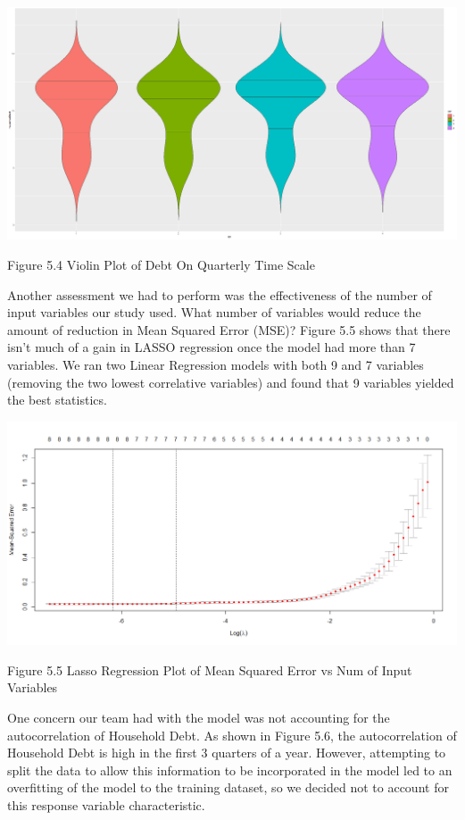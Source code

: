 \documentclass[sigconf,nonacm,11pt]{acmart}
\begin{document}
 
\vspace{0.5em}
\includegraphics[scale = 0.13]{QtrVSHouseholdDebt_violinPlot.png}

Figure 5.4 Violin Plot of Debt On Quarterly Time Scale
\vspace{0.75em}

Another assessment we had to perform was the effectiveness of the number of input variables our study used. What number of variables would reduce the amount of reduction in Mean Squared Error (MSE)?  Figure 5.5 shows that there isn't much of a gain in LASSO regression once the model had more than 7 variables.  We ran two Linear Regression models with both 9 and 7 variables (removing the two lowest correlative variables) and found that 9 variables yielded the best statistics.


\vspace{0.5em}
\includegraphics[scale = 0.18]{LASSORegression_Plot.png}

Figure 5.5 Lasso Regression Plot of Mean Squared Error vs Num of Input Variables
\vspace{0.75em}

One concern our team had with the model was not accounting for the autocorrelation of Household Debt.  As shown in Figure 5.6, the autocorrelation of Household Debt is high in the first 3 quarters of a year.  However, attempting to split the data to allow this information to be incorporated in the model led to an overfitting of the model to the training dataset, so we decided not to account for this response variable characteristic.
\end{document}
